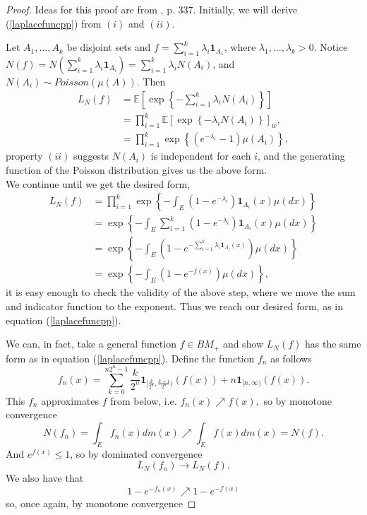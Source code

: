 \documentclass[11pt, oneside]{article}   	%
\theoremstyle{definition}
\theoremstyle{remark}
\begin{document}
\begin{proof}
  Ideas for this proof are from \cite{resnick2005}, p. 337. Initially, we will derive (\ref{laplacefuncpp}) from $(i)$ and $(ii)$. 

  Let $A_1,...,A_k$ be disjoint sets and $f=\sum_{i=1}^{k}\lambda_i \mathbf{1}_{A_1}$, where $\lambda_1,...,\lambda_k >0$. Notice $N(f)=N(\sum_{i=1}^k \lambda_i \mathbf{1}_{A_i})=\sum_{i=1}^k \lambda_i N(A_i)$, and $N(A_i) \sim \textit{Poisson}(\mu(A))$. Then
\begin{align*}
  L_N(f) 
    &= \mathbb{E}\left[\exp \left\{-\sum_{i=1}^k \lambda_i N(A_i)\right\}\right] \\
    &= \prod_{i=1}^k\mathbb{E}\left[\exp \left\{ -\lambda_i N(A_i)\right\}\right]_{w
    },\\
    &= \prod_{i=1}^k \exp \left\{\left(e^{-\lambda_i}-1 \right)\mu(A_i) \right\},
\end{align*}
  property $(ii)$ suggests $N(A_i)$ is independent for each $i$, and the generating function of the Poisson distribution gives us the above form.\\
  We continue until we get the desired form,
  \begin{align*}
  L_N(f)
    &= \prod_{i=1}^k \exp \left\{-\int_{E} (1-e^{-\lambda_i})\mathbf{1}_{A_i}(x)\mu(dx)\right\} \\
    &= \exp \left\{-\int_{E} \sum_{i=1}^k (1-e^{-\lambda_i})\mathbf{1}_{A_i}(x)\mu(dx)\right\} \\
    &= \exp \left\{-\int_{E} (1-e^{-\sum_{i=1}^k\lambda_i \mathbf{1}_{A_i}(x)})\mu(dx)\right\} \\
    &= \exp \left\{-\int_{E} (1-e^{-f(x)})\mu(dx)\right\},
  \end{align*}
  it is easy enough to check the validity of the above step, where we move the sum and indicator function to the exponent. Thus we reach our desired form, as in equation (\ref{laplacefuncpp}).

  We can, in fact, take a general function $f \in BM_+$ and show $L_N(f)$ has the same form as in equation (\ref{laplacefuncpp}). Define the function $f_n$ as follows
$$f_n(x) = \sum_{k=0}^{n2^n-1} \frac{k}{2^n} \mathbf{1}_{[\frac{k}{2^n}, \frac{k+1}{2^n})}(f(x)) + n\mathbf{1}_{[n, \infty)}(f(x)).$$
This $f_n$ approximates $f$ from below, i.e. 
$f_n(x) \nearrow f(x),$
so by monotone convergence 
$$N(f_n) = \int_{E} f_n(x) dm(x) \nearrow \int_{E} f(x) dm(x) = N(f).$$
And $e^{f(x)} \leq 1$, so by dominated convergence
$$L_N(f_n) \to L_N(f).$$
We also have that 
$$1- e^{-f_n(x)} \nearrow 1-e^{-f(x)}$$
so, once again, by monotone convergence


\end{proof}
\end{document}
